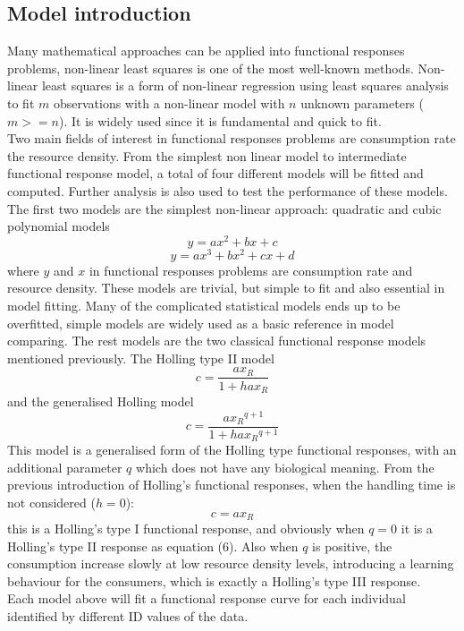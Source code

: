\documentclass{article}[11pt,a4,twosided,doublespacing,titlepagenumber=on,numbers=endperiod]
\begin{document}
\subsection{Model introduction}
Many mathematical approaches can be applied into functional responses problems, non-linear least squares is one of the most well-known methods. Non-linear least squares is a form of non-linear regression using least squares analysis to fit $m$ observations with a non-linear model with $n$ unknown parameters ($m >= n$). It is widely used since it is fundamental and quick to fit\cite{cadet2006quantitative}. \\
\noindent
Two main fields of interest in functional responses problems are consumption rate the resource density. From the simplest non linear model to intermediate functional response model, a total of four different models will be fitted and computed. Further analysis is also used to test the performance of these models. \\
\noindent
The first two models are the simplest non-linear approach: quadratic and cubic polynomial models
\begin{equation}
    y = a x^2 + b x + c
\end{equation}
\begin{equation}
    y = a x^3 + b x^2 + c x + d
\end{equation}
where $y$ and $x$ in functional responses problems are consumption rate and resource density. These models are trivial, but simple to fit and also essential in model fitting. Many of the complicated statistical models ends up to be overfitted, simple models are widely used as a basic reference in model comparing.
The rest models are the two classical functional response models mentioned previously. The Holling type II model
\begin{equation}
    c = \frac{a x_R}{1+ h a x_R}
\end{equation}
and the generalised Holling model
\begin{equation}
    c = \frac{a {x_R}^{q+1}}{1 + h a {x_R}^{q+1}}
\end{equation}
This model is a generalised form of the Holling type functional responses, with an additional parameter $q$ which does not have any biological meaning. From the previous introduction of Holling's functional responses, when the handling time is not considered ($h = 0$):
\begin{equation}
    c = a x_R
\end{equation}
this is a Holling's type I functional response, and obviously when $q = 0$ it is a Holling's type II response as equation (6). Also when $q$ is positive, the consumption increase slowly at low resource density levels, introducing a learning behaviour for the consumers, which is exactly a Holling's type III response. \\
\noindent Each model above will fit a functional response curve for each individual identified by different ID values of the data. 
\end{document}
